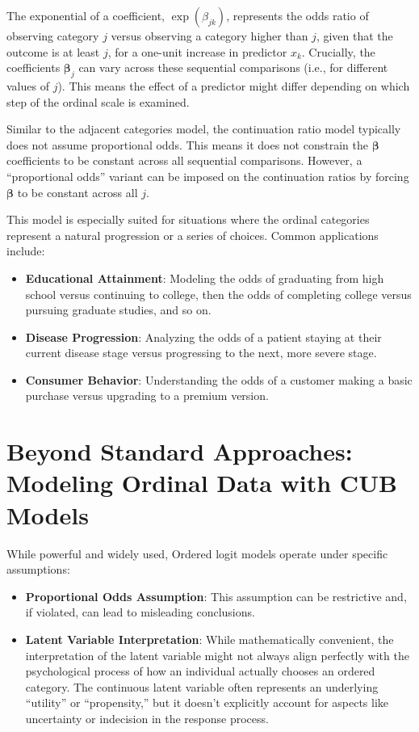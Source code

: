 \documentclass[
  letterpaper,
  DIV=11,
  numbers=noendperiod]{scrartcl}
\begin{document}
The exponential of a coefficient, \(\exp(\beta_{jk})\), represents the
odds ratio of observing category \(j\) versus observing a category
higher than \(j\), given that the outcome is at least \(j\), for a
one-unit increase in predictor \(x_k\). Crucially, the coefficients
\(\boldsymbol{\beta}_j\) can vary across these sequential comparisons
(i.e., for different values of \(j\)). This means the effect of a
predictor might differ depending on which step of the ordinal scale is
examined.

Similar to the adjacent categories model, the continuation ratio model
typically does not assume proportional odds. This means it does not
constrain the \(\boldsymbol{\beta}\) coefficients to be constant across
all sequential comparisons. However, a ``proportional odds'' variant can
be imposed on the continuation ratios by forcing \(\boldsymbol{\beta}\)
to be constant across all \(j\).

This model is especially suited for situations where the ordinal
categories represent a natural progression or a series of choices.
Common applications include:

\begin{itemize}
\item
  \textbf{Educational Attainment}: Modeling the odds of graduating from
  high school versus continuing to college, then the odds of completing
  college versus pursuing graduate studies, and so on.
\item
  \textbf{Disease Progression}: Analyzing the odds of a patient staying
  at their current disease stage versus progressing to the next, more
  severe stage.
\item
  \textbf{Consumer Behavior}: Understanding the odds of a customer
  making a basic purchase versus upgrading to a premium version.
\end{itemize}

\hypertarget{beyond-standard-approaches-modeling-ordinal-data-with-cub-models}{%
\section{Beyond Standard Approaches: Modeling Ordinal Data with CUB
Models}\label{beyond-standard-approaches-modeling-ordinal-data-with-cub-models}}

While powerful and widely used, Ordered logit models operate under
specific assumptions:

\begin{itemize}
\item
  \textbf{Proportional Odds Assumption}: This assumption can be
  restrictive and, if violated, can lead to misleading conclusions.
\item
  \textbf{Latent Variable Interpretation}: While mathematically
  convenient, the interpretation of the latent variable might not always
  align perfectly with the psychological process of how an individual
  actually chooses an ordered category. The continuous latent variable
  often represents an underlying ``utility'' or ``propensity,'' but it
  doesn't explicitly account for aspects like uncertainty or indecision
  in the response process.
\end{itemize}
\end{document}
